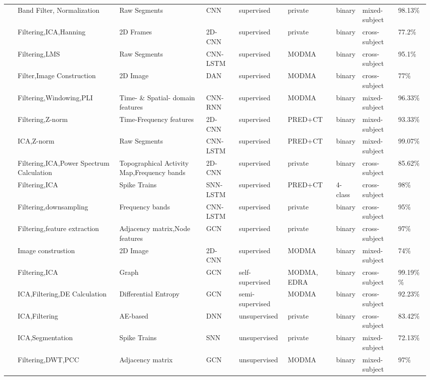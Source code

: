 \begin{table*}[ht]
\begin{tabular}{p{0.4cm}p{2.8cm}p{2cm}p{1.5cm}p{1.9cm}p{1.9cm}p{0.8cm}p{1.8cm}p{1.5cm}}
~\cite{MDD45} & Band Filter, \newline Normalization & Raw Segments & CNN & supervised & private & binary & mixed-subject & 98.13\% \\
~\cite{MDD46} & Filtering,ICA,Hanning & 2D Frames & 2D-CNN & supervised & private & binary & cross-subject & 77.2\% \\
~\cite{MDD47} & Filtering,LMS & Raw Segments & CNN-LSTM & supervised & MODMA & binary & cross-subject & 95.1\% \\
~\cite{MDD48} & Filter,Image Construction & 2D Image & DAN & supervised & MODMA & binary & cross-subject & 77\% \\
~\cite{MDD49} & Filtering,Windowing,PLI & Time- \& Spatial- domain features & CNN-RNN & supervised & MODMA & binary & mixed-subject & 96.33\% \\
~\cite{MDD50} & Filtering,Z-norm & Time-Frequency features & 2D-CNN & supervised & PRED+CT & binary & mixed-subject & 93.33\% \\
~\cite{MDD51} & ICA,Z-norm & Raw Segments & CNN-LSTM & supervised & PRED+CT & binary & mixed-subject & 99.07\% \\
~\cite{li2019eeg} & Filtering,ICA,Power Spectrum Calculation & Topographical Activity Map,\newline Frequency bands & 2D-CNN & supervised & private & binary & cross-subject & 85.62\% \\
~\cite{sam2023depression} & Filtering,ICA & Spike Trains & SNN-LSTM & supervised & PRED+CT & 4-class & cross-subject & 98\% \\
~\cite{song2022lsdd} & Filtering,downsampling & Frequency bands & CNN-LSTM & supervised & private & binary & cross-subject & 95\% \\
~\cite{zhu2022eeg} & Filtering,feature extraction & Adjacency matrix,Node features &	GCN	& supervised & private & binary & cross-subject & 97\%\\
~\cite{wang2023depression} & Image construstion & 2D Image & 2D-CNN & supervised & MODMA & binary & mixed-subject & 74\%\\
~\cite{MDD12} & Filtering,ICA & Graph & GCN & self-supervised & MODMA, \newline EDRA & binary & cross-subject & 99.19\% \newline 98.38\% \\
~\cite{MDD1} & ICA,Filtering,\newline DE Calculation & Differential Entropy & GCN & semi-supervised & MODMA & binary & cross-subject & 92.23\% \\
~\cite{zhu2019multimodal} & ICA,Filtering & AE-based & DNN & unsupervised & private & binary & cross-subject & 83.42\% \\
~\cite{shah2019deep} & ICA,Segmentation & Spike Trains & SNN & unsupervised & private & binary & mixed-subject & 72.13\% \\
~\cite{li2023gcns} & Filtering,DWT,PCC & Adjacency matrix & GCN & unsupervised & MODMA & binary & mixed-subject & 97\%\\
\hline
\end{tabular}
\end{table*}

